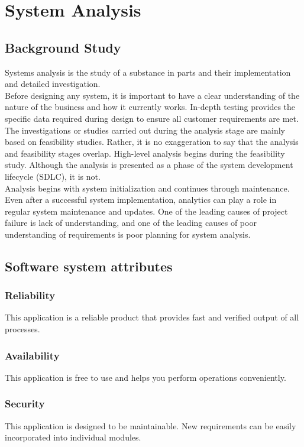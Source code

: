 \documentclass{article}
\begin{document}
\section{System Analysis}
\subsection{Background Study}
Systems analysis is the study of a substance in parts and their implementation and detailed investigation.\\
Before designing any system, it is important to have a clear understanding of the nature of the business and how it currently works. In-depth testing provides the specific data required during design to ensure all customer requirements are met. The investigations or studies carried out during the analysis stage are mainly based on feasibility studies. Rather, it is no exaggeration to say that the analysis and feasibility stages overlap. High-level analysis begins during the feasibility study. Although the analysis is presented as a phase of the system development lifecycle (SDLC), it is not. \\Analysis begins with system initialization and continues through maintenance. Even after a successful system implementation, analytics can play a role in regular system maintenance and updates. One of the leading causes of project failure is lack of understanding, and one of the leading causes of poor understanding of requirements is poor planning for system analysis. 
\newpage
\subsection{Software system attributes}
\subsubsection{Reliability}This application is a reliable product that provides fast and verified output of all processes.
\subsubsection{Availability}
This application is free to use and helps you perform operations conveniently.
\subsubsection{Security}
This application is designed to be maintainable. New requirements can be easily incorporated into individual modules. 
\newpage
\end{document}
